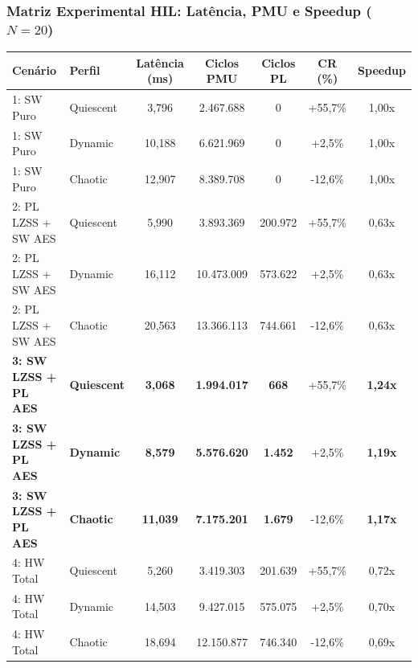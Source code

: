 \begin{frame}
  \frametitle{Matriz Experimental HIL: Lat\^encia, PMU e Speedup ($N=20$)}
  \scriptsize
  \renewcommand{\arraystretch}{1.12}
  \begin{tabular}{@{}llccccc@{}}
    \toprule
    \textbf{Cen\'ario} & \textbf{Perfil} & \textbf{Lat\^encia (ms)} & \textbf{Ciclos PMU} & \textbf{Ciclos PL} & \textbf{CR (\%)} & \textbf{Speedup}\\
    \midrule
    1: SW Puro & Quiescent & 3,796 & 2.467.688 & 0 & +55,7\% & 1,00x\\
    1: SW Puro & Dynamic & 10,188 & 6.621.969 & 0 & +2,5\% & 1,00x\\
    1: SW Puro & Chaotic & 12,907 & 8.389.708 & 0 & -12,6\% & 1,00x\\
    \midrule
    2: PL LZSS + SW AES & Quiescent & 5,990 & 3.893.369 & 200.972 & +55,7\% & 0,63x\\
    2: PL LZSS + SW AES & Dynamic & 16,112 & 10.473.009 & 573.622 & +2,5\% & 0,63x\\
    2: PL LZSS + SW AES & Chaotic & 20,563 & 13.366.113 & 744.661 & -12,6\% & 0,63x\\
    \midrule
    \textbf{3: SW LZSS + PL AES} & \textbf{Quiescent} & \textbf{3,068} & \textbf{1.994.017} & \textbf{668} & +55,7\% & \textbf{1,24x}\\
    \textbf{3: SW LZSS + PL AES} & \textbf{Dynamic} & \textbf{8,579} & \textbf{5.576.620} & \textbf{1.452} & +2,5\% & \textbf{1,19x}\\
    \textbf{3: SW LZSS + PL AES} & \textbf{Chaotic} & \textbf{11,039} & \textbf{7.175.201} & \textbf{1.679} & -12,6\% & \textbf{1,17x}\\
    \midrule
    4: HW Total & Quiescent & 5,260 & 3.419.303 & 201.639 & +55,7\% & 0,72x\\
    4: HW Total & Dynamic & 14,503 & 9.427.015 & 575.075 & +2,5\% & 0,70x\\
    4: HW Total & Chaotic & 18,694 & 12.150.877 & 746.340 & -12,6\% & 0,69x\\
    \bottomrule
  \end{tabular}
\end{frame}
